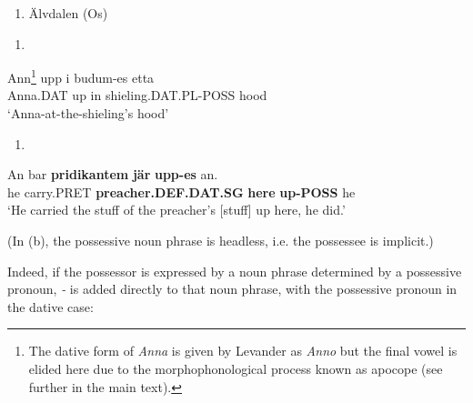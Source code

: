 \begin{enumerate} %
\item 
Älvdalen (Os)

\end{enumerate} %
\setcounter{listLFOxcviiileveli}{0}
\begin{enumerate} %
\item 
\end{enumerate} %
\ea\label{}
\gll Ann\footnote{ The dative form of \textit{Anna} is given by Levander as \textit{Anno} but the final vowel is elided here due to the morphophonological process known as apocope (see further in the main text).}  upp  i  budum-es   etta \\


Anna.DAT  up  in  shieling.DAT.PL-POSS  hood\\ %


‘Anna-at-the-shieling’s hood’ 
\z


\begin{enumerate} %
\item 
\end{enumerate} %
\ea\label{}
\gll An  bar  \textbf{pridikantem}\textbf{  jär}\textbf{  upp-es} an. \\


he  carry.PRET  \textbf{preacher.DEF.DAT.SG} \textbf{here} \textbf{up-POSS} he\\ %


‘He carried the stuff of the preacher’s [stuff] up here, he did.’
\z


(In (b), the possessive noun phrase is headless, i.e. the possessee is implicit.) 

Indeed, if the possessor is expressed by a noun phrase determined by a possessive pronoun,\textit{ {}-} is added directly to that noun phrase, with the possessive pronoun in the dative case:

